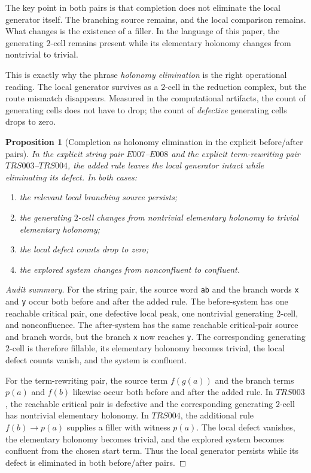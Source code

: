 \documentclass[11pt]{article}
\numberwithin{equation}{section}
\newtheorem{proposition}[theorem]{Proposition}
\theoremstyle{definition}
\theoremstyle{remark}
\begin{document}
The key point in both pairs is that completion does not eliminate the local generator itself. The branching source remains, and the local comparison remains. What changes is the existence of a filler. In the language of this paper, the generating $2$-cell remains present while its elementary holonomy changes from nontrivial to trivial.

This is exactly why the phrase \emph{holonomy elimination} is the right operational reading. The local generator survives as a $2$-cell in the reduction complex, but the route mismatch disappears. Measured in the computational artifacts, the count of generating cells does not have to drop; the count of \emph{defective} generating cells drops to zero.

\begin{proposition}[Completion as holonomy elimination in the explicit before/after pairs]
\label{prop:completion-as-holonomy-elimination}
In the explicit string pair $E007$--$E008$ and the explicit term-rewriting pair $TRS003$--$TRS004$, the added rule leaves the local generator intact while eliminating its defect. In both cases:
\begin{enumerate}
    \item the relevant local branching source persists;
    \item the generating $2$-cell changes from nontrivial elementary holonomy to trivial elementary holonomy;
    \item the local defect counts drop to zero;
    \item the explored system changes from nonconfluent to confluent.
\end{enumerate}
\end{proposition}

\begin{proof}[Audit summary]
For the string pair, the source word \texttt{ab} and the branch words \texttt{x} and \texttt{y} occur both before and after the added rule. The before-system has one reachable critical pair, one defective local peak, one nontrivial generating $2$-cell, and nonconfluence. The after-system has the same reachable critical-pair source and branch words, but the branch \texttt{x} now reaches \texttt{y}. The corresponding generating $2$-cell is therefore fillable, its elementary holonomy becomes trivial, the local defect counts vanish, and the system is confluent.

For the term-rewriting pair, the source term $f(g(a))$ and the branch terms $p(a)$ and $f(b)$ likewise occur both before and after the added rule. In $TRS003$, the reachable critical pair is defective and the corresponding generating $2$-cell has nontrivial elementary holonomy. In $TRS004$, the additional rule $f(b) \to p(a)$ supplies a filler with witness $p(a)$. The local defect vanishes, the elementary holonomy becomes trivial, and the explored system becomes confluent from the chosen start term. Thus the local generator persists while its defect is eliminated in both before/after pairs.
\end{proof}
\end{document}

